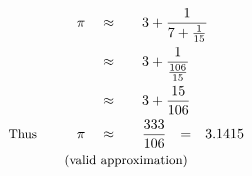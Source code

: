 \begin{alignat*}{5}
&\,&\pi\quad&\approx\quad&&3+\frac{1}{7+\frac{1}{15}}\\
&\,&\,&\approx&&3+\frac{1}{\frac{106}{15}}\\
&\,&\,&\approx&&3+\frac{15}{106}\\
&\small\text{Thus}\qquad&\pi\quad&\approx&&\frac{333}{106}\rlap{\quad=\quad3.1415}\\
&\rlap{\qquad\qquad\small\text{(valid approximation)}}
\end{alignat*}
